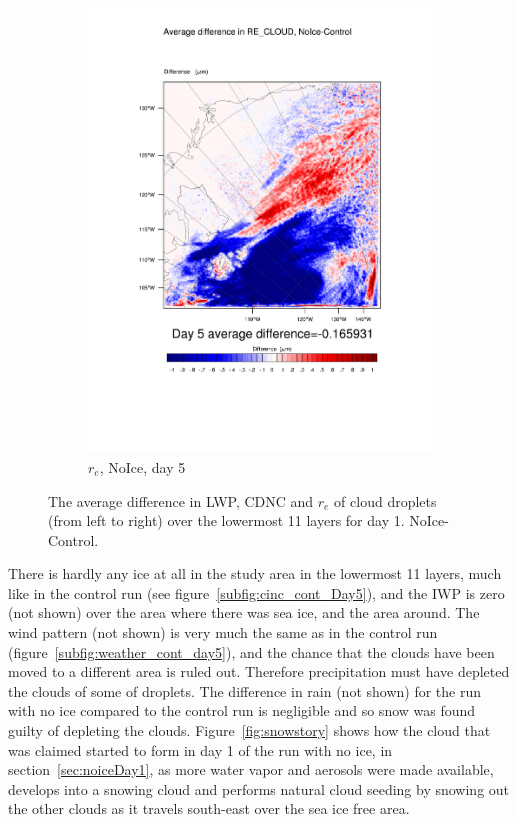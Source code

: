 \begin{figure}
\begin{subfigure}{0.32\textwidth}
		\includegraphics[width=\textwidth]{results/noice/diff_NoIce_RE_CLOUD_Day5.pdf}
		\caption{$r_e$, NoIce, day 5}
		\label{subfig:recloud_r2Day5}
	\end{subfigure}
\caption{The average difference in LWP, CDNC and $r_e$ of cloud droplets (from left to right) over the lowermost 11 layers for day 1. NoIce-Control.}
\label{fig:lwpcdncre_r2Day5}
\end{figure}

There is hardly any ice at all in the study area in the lowermost 11 layers, much like in the control run (see figure~\ref{subfig:cinc_cont_Day5}), and the IWP is zero (not shown) over the area where there was sea ice, and the area around. The wind pattern (not shown) is very much the same as in the control run (figure~\ref{subfig:weather_cont_day5}), and the chance that the clouds have been moved to a different area is ruled out. Therefore precipitation must have depleted the clouds of some of droplets. The difference in rain (not shown) for the run with no ice compared to the control run is negligible and so snow was found guilty of depleting the clouds. Figure~\ref{fig:snowstory} shows how the cloud that was claimed started to form in day 1 of the run with no ice, in section~\ref{sec:noiceDay1}, as more water vapor and aerosols were made available, develops into a snowing cloud and performs natural cloud seeding by snowing out the other clouds as it travels south-east over the sea ice free area.

